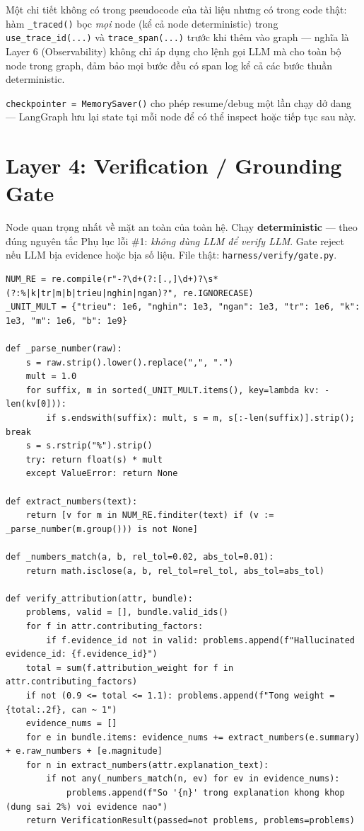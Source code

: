 \documentclass[12pt,a4paper]{article}
\newcommand{\file}[1]{\texttt{#1}}
\begin{document}
Một chi tiết không có trong pseudocode của tài liệu nhưng có trong code thật: hàm
\texttt{\_traced()} bọc \emph{mọi} node (kể cả node deterministic) trong
\texttt{use\_trace\_id(...)} và \texttt{trace\_span(...)} trước khi thêm vào graph --- nghĩa là
Layer 6 (Observability) không chỉ áp dụng cho lệnh gọi LLM mà cho toàn bộ node trong graph, đảm
bảo mọi bước đều có span log kể cả các bước thuần deterministic.

\texttt{checkpointer = MemorySaver()} cho phép resume/debug một lần chạy dở dang --- LangGraph lưu
lại state tại mỗi node để có thể inspect hoặc tiếp tục sau này.

\section{Layer 4: Verification / Grounding Gate}

Node quan trọng nhất về mặt an toàn của toàn hệ. Chạy \textbf{deterministic} --- theo đúng nguyên
tắc Phụ lục lỗi \#1: \emph{không dùng LLM để verify LLM}. Gate reject nếu LLM bịa evidence hoặc
bịa số liệu. File thật: \file{harness/verify/gate.py}.

\begin{lstlisting}
NUM_RE = re.compile(r"-?\d+(?:[.,]\d+)?\s*(?:%|k|tr|m|b|trieu|nghin|ngan)?", re.IGNORECASE)
_UNIT_MULT = {"trieu": 1e6, "nghin": 1e3, "ngan": 1e3, "tr": 1e6, "k": 1e3, "m": 1e6, "b": 1e9}

def _parse_number(raw):
    s = raw.strip().lower().replace(",", ".")
    mult = 1.0
    for suffix, m in sorted(_UNIT_MULT.items(), key=lambda kv: -len(kv[0])):
        if s.endswith(suffix): mult, s = m, s[:-len(suffix)].strip(); break
    s = s.rstrip("%").strip()
    try: return float(s) * mult
    except ValueError: return None

def extract_numbers(text):
    return [v for m in NUM_RE.finditer(text) if (v := _parse_number(m.group())) is not None]

def _numbers_match(a, b, rel_tol=0.02, abs_tol=0.01):
    return math.isclose(a, b, rel_tol=rel_tol, abs_tol=abs_tol)

def verify_attribution(attr, bundle):
    problems, valid = [], bundle.valid_ids()
    for f in attr.contributing_factors:
        if f.evidence_id not in valid: problems.append(f"Hallucinated evidence_id: {f.evidence_id}")
    total = sum(f.attribution_weight for f in attr.contributing_factors)
    if not (0.9 <= total <= 1.1): problems.append(f"Tong weight = {total:.2f}, can ~ 1")
    evidence_nums = []
    for e in bundle.items: evidence_nums += extract_numbers(e.summary) + e.raw_numbers + [e.magnitude]
    for n in extract_numbers(attr.explanation_text):
        if not any(_numbers_match(n, ev) for ev in evidence_nums):
            problems.append(f"So '{n}' trong explanation khong khop (dung sai 2%) voi evidence nao")
    return VerificationResult(passed=not problems, problems=problems)
\end{lstlisting}
\end{document}
